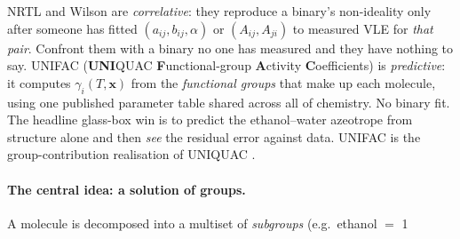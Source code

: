 \documentclass[11pt,a4paper]{article}
\newcommand{\xv}{\mathbf{x}}
\begin{document}
NRTL and Wilson are \emph{correlative}: they reproduce a binary's
non-ideality only after someone has fitted $(a_{ij}, b_{ij}, \alpha)$ or
$(A_{ij}, A_{ji})$ to measured VLE for \emph{that pair}. Confront them
with a binary no one has measured and they have nothing to say. UNIFAC
(\textbf{UNI}QUAC \textbf{F}unctional-group \textbf{A}ctivity
\textbf{C}oefficients) is \emph{predictive}: it computes $\gamma_i(T,
\xv)$ from the \emph{functional groups} that make up each molecule, using
one published parameter table shared across all of chemistry. No binary
fit. The headline glass-box win is to predict the ethanol--water
azeotrope from structure alone and then \emph{see} the residual error
against data. UNIFAC is the group-contribution realisation of UNIQUAC
\cite{Fredenslund1975, RPP}.

\paragraph{The central idea: a solution of groups.} A molecule is
decomposed into a multiset of \emph{subgroups} (e.g.\ ethanol $=$ 1
\end{document}
